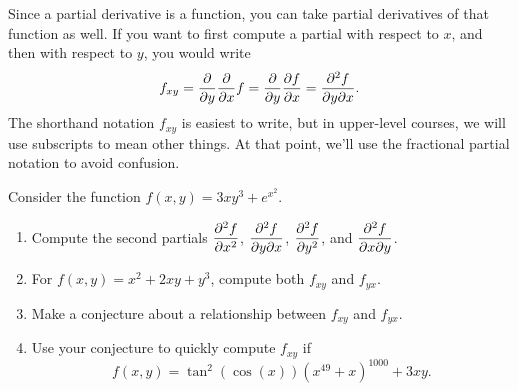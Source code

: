 Since a partial derivative is a function, you can take partial derivatives of that function as well.  If you want to first compute a partial with respect to $x$, and then with respect to $y$, you would write $$f_{xy}=\displaystyle\frac{\partial}{\partial y}\frac{\partial}{\partial x}f = \frac{\partial}{\partial y}\frac{\partial f}{\partial x} = \frac{\partial^2 f}{\partial y \partial x}.$$
The shorthand notation $f_{xy}$ is easiest to write, but in upper-level courses, we will use subscripts to mean other things. At that point, we'll use the fractional partial notation to avoid confusion.

\begin{problem}%
Consider the function $f(x,y)=3xy^3+e^{x^2}.$
\begin{enumerate}
 \item Compute the second partials $\displaystyle \frac{\partial^2 f}{ \partial x^2}$, $\displaystyle\frac{\partial^2 f}{\partial y \partial x}$, $\displaystyle\frac{\partial^2 f}{\partial y^2}$, and $\displaystyle\frac{\partial^2 f}{\partial x \partial y}$.
 \item For $f(x,y)=x^2+2xy+y^3$, compute both $f_{xy}$ and $f_{yx}$.  
 \item Make a conjecture about a relationship between $f_{xy}$ and $f_{yx}$.
 \item Use your conjecture to quickly compute $f_{xy}$ if $$f(x,y)=\tan^{2}(\cos(x)) (x^{49}+x)^{1000}+3xy.$$ 
\end{enumerate}
\end{problem}



